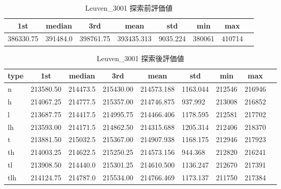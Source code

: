 \begin{table}[htbp]
    \centering
    \caption{Leuven\_3001 探索前評価値}
    \begin{tabular}{|l|l|l|l|l|l|l|l|}\hline
    \multicolumn{1}{|c|}{\textbf{1st}}
    &\multicolumn{1}{c|}{\textbf{median}}
    &\multicolumn{1}{c|}{\textbf{3rd}}
    &\multicolumn{1}{c|}{\textbf{mean}}
    &\multicolumn{1}{c|}{\textbf{std}}
    &\multicolumn{1}{c|}{\textbf{min}}
    &\multicolumn{1}{c|}{\textbf{max}}\\\hline
	386330.75 & 391484.0 & 398761.75 & 393435.313 & 9035.224 & 380061 & 410714\\\hline
	\end{tabular}
\end{table}
\begin{table}[htbp]
    \centering
    \caption{Leuven\_3001 探索後評価値}
    \begin{tabular}{|l|l|l|l|l|l|l|l|l|}\hline
    \multicolumn{1}{|c|}{\textbf{type}}
    &\multicolumn{1}{|c|}{\textbf{1st}}
    &\multicolumn{1}{c|}{\textbf{median}}
    &\multicolumn{1}{c|}{\textbf{3rd}}
    &\multicolumn{1}{c|}{\textbf{mean}}
    &\multicolumn{1}{c|}{\textbf{std}}
    &\multicolumn{1}{c|}{\textbf{min}}
    &\multicolumn{1}{c|}{\textbf{max}}\\\hline
	n & 213580.50 & 214473.5 & 215430.00 & 214573.188 & 1163.044 & 212546 & 216946\\\hline
	h & 214067.25 & 214777.5 & 215357.00 & 214746.875 & 937.992 & 213008 & 216852\\\hline
	l & 213687.75 & 214417.5 & 214995.75 & 214466.406 & 1178.595 & 212581 & 217702\\\hline
	lh & 213593.00 & 214171.5 & 214862.50 & 214315.688 & 1205.314 & 212406 & 218370\\\hline
	t & 213881.50 & 215032.5 & 215367.00 & 214907.938 & 1168.175 & 212946 & 217923\\\hline
	th & 214003.25 & 214622.5 & 215250.25 & 214573.156 & 944.368 & 212820 & 216241\\\hline
	tl & 213908.50 & 214440.0 & 215301.25 & 214610.500 & 1136.247 & 212670 & 217391\\\hline
	tlh & 214124.75 & 214787.0 & 215534.00 & 214766.469 & 1173.137 & 211750 & 217384\\\hline
	\end{tabular}
\end{table}
